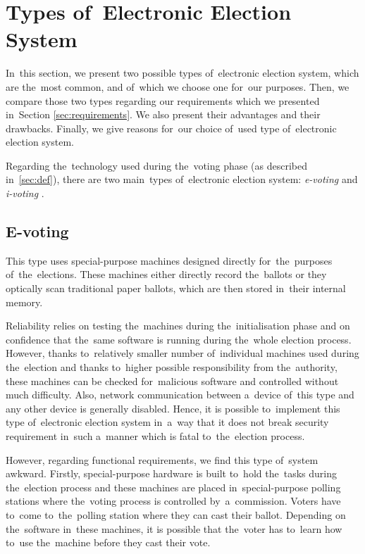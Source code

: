 \section{Types of~Electronic Election System}

In~this section, we present two possible types of~electronic election system, which are the~most common, and of~which we choose one for~our purposes. Then, we compare those two types regarding our requirements which we presented in~Section \ref{sec:requirements}. We also present their advantages and their drawbacks. Finally, we give reasons for~our choice of~used type of~electronic election system.

Regarding the~technology used during the~voting phase (as described in~\ref{sec:def}), there are two main~types of~electronic election system: \emph{e-voting} and \emph{i-voting} \cite{Brit}.

\subsection{E-voting} 
This type uses special-purpose machines designed directly for~the~purposes of~the~elections. These machines either directly record the~ballots or they optically scan traditional paper ballots, which are then stored in~their internal memory. 

Reliability relies on testing the~machines during the~initialisation phase and on confidence that the~same software is running during the~whole election process. However, thanks to~relatively smaller number of~individual machines used during the~election and thanks to~higher possible responsibility from the~authority, these machines can be checked for~malicious software and controlled without much difficulty. Also, network communication between a~device of~this type and any other device is generally disabled. Hence, it is possible to~implement this type of~electronic election system in~a~way that it does not break security requirement in~such a~manner which is fatal to~the~election process. 

However, regarding functional requirements, we find this type of~system awkward. Firstly, special-purpose hardware is built to~hold the~tasks during the~election process and these machines are placed in~special-purpose polling stations where the~voting process is controlled by~a~commission. Voters have to~come to~the~polling station where they can cast their ballot. Depending on the~software in~these machines, it is possible that the~voter has to~learn how to~use the~machine before they cast their vote.

